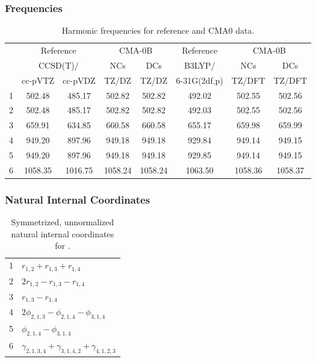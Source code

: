 \documentclass[10pt,oneside]{article}
\begin{document}
\subsubsection*{Frequencies}
\begin{table}[h!]
\centering
\caption{Harmonic frequencies for reference and CMA0 data.}
\begin{tabular}{cccccccc}
\toprule
{} & \multicolumn{2}{c}{Reference} & \multicolumn{2}{c}{CMA-0B} &    Reference & \multicolumn{2}{c}{CMA-0B} \\
{} & \multicolumn{2}{c}{CCSD(T)/} &     NCs &     DCs &       B3LYP/ &     NCs &     DCs \\
{} &   cc-pVTZ & cc-pVDZ &   TZ/DZ &   TZ/DZ & 6-31G(2df,p) &  TZ/DFT &  TZ/DFT \\
\midrule
1 &    502.48 &  485.17 &  502.82 &  502.82 &       492.02 &  502.55 &  502.56 \\
2 &    502.48 &  485.17 &  502.82 &  502.82 &       492.03 &  502.55 &  502.56 \\
3 &    659.91 &  634.85 &  660.58 &  660.58 &       655.17 &  659.98 &  659.99 \\
4 &    949.20 &  897.96 &  949.18 &  949.18 &       929.84 &  949.14 &  949.15 \\
5 &    949.20 &  897.96 &  949.18 &  949.18 &       929.85 &  949.14 &  949.15 \\
6 &   1058.35 & 1016.75 & 1058.24 & 1058.24 &      1063.50 & 1058.36 & 1058.37 \\
\bottomrule
\end{tabular}
\end{table}

\clearpage

\subsubsection*{Natural Internal Coordinates}
\begin{table}[h!]
\centering
\caption{Symmetrized, unnormalized natural internal coordinates for .}
\small
\begin{tabular}{ll}
  1   & $r_{1,2} + r_{1,3} + r_{1,4}$ \\
  2   & $2r_{1,2} - r_{1,3} - r_{1,4}$ \\
  3   & $r_{1,3} - r_{1,4}$ \\
  4   & $2\phi_{2,1,3} - \phi_{2,1,4} - \phi_{3,1,4}$ \\
  5   & $\phi_{2,1,4} - \phi_{3,1,4}$ \\
  6   & $\gamma_{2,1,3,4} + \gamma_{3,1,4,2} + \gamma_{4,1,2,3}$ \\
\end{tabular}
\end{table}
\end{document}

